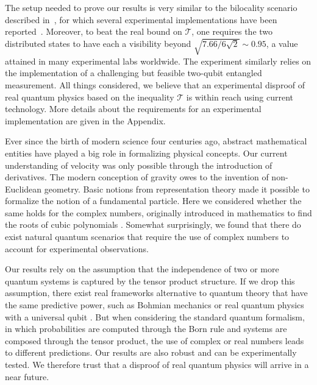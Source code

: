 \documentclass[onecolumn,prx,amsmath,amssymb]{revtex4-2}
\begin{document}
The setup needed to prove our results is very similar to the bilocality scenario described in~\cite{bilocality}, for which several experimental implementations have been reported~\cite{sciarrino,pryde,pan, Baumer2020}. Moreover, to beat the real bound on $\mathscr{T}$, one requires the two distributed states to have each a visibility beyond $\sqrt{7.66/6\sqrt 2}\sim 0.95$, a value attained in many experimental labs worldwide. The experiment similarly relies on the implementation of a challenging \cite{Bell_meas_impossible} but feasible \cite{Bell_meas_possible} two-qubit entangled measurement. All things considered, we believe that an experimental disproof of real quantum physics based on the inequality $\mathscr{T}$ is within reach using current technology. More details about the requirements for an experimental implementation are given in the Appendix.

Ever since the birth of modern science four centuries ago, abstract mathematical entities have played a big role in formalizing physical concepts. Our current understanding of velocity was only possible through the introduction of derivatives. The modern conception of gravity owes to the invention of non-Euclidean geometry. Basic notions from representation theory made it possible to formalize the notion of a fundamental particle. Here we considered whether the same holds for the complex numbers, originally introduced in mathematics to find the roots of cubic polynomials \cite{complex_numbers}. Somewhat surprisingly, we found that there do exist natural quantum scenarios that require the use of complex numbers to account for experimental observations. 

Our results rely on the assumption that the independence of two or more quantum systems is captured by the tensor product structure. If we drop this assumption, there exist real frameworks alternative to quantum theory that have the same predictive power, such as Bohmian mechanics \cite{Bohm} or real quantum physics with a universal qubit \cite{Aleksandrova_2013}. But when considering the standard quantum formalism, in which probabilities are computed through the Born rule and systems are composed through the tensor product, the use of complex or real numbers leads to different predictions. Our results are also robust and can be experimentally tested. We therefore trust that a disproof of real quantum physics will arrive in a near future.
\end{document}
